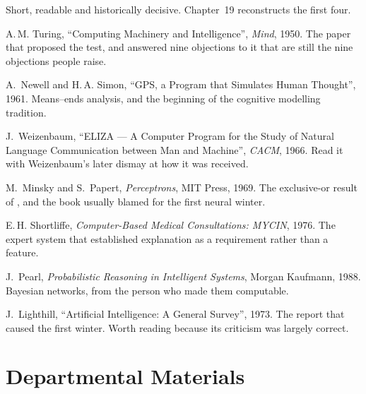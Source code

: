Short, readable and historically decisive. Chapter~19 reconstructs the first four.

\begin{tight}
  \item A.\,M. Turing, ``Computing Machinery and Intelligence'', \emph{Mind},
        1950. The paper that proposed the test, and answered nine objections to it
        that are still the nine objections people raise.
  \item A.\ Newell and H.\,A. Simon, ``GPS, a Program that Simulates Human
        Thought'', 1961. Means--ends analysis, and the beginning of the cognitive
        modelling tradition.
  \item J.\ Weizenbaum, ``ELIZA --- A Computer Program for the Study of Natural
        Language Communication between Man and Machine'', \emph{CACM}, 1966. Read
        it with Weizenbaum's later dismay at how it was received.
  \item M.\ Minsky and S.\ Papert, \emph{Perceptrons}, MIT Press, 1969. The
        exclusive-or result of , and the book usually blamed for
        the first neural winter.
  \item E.\,H. Shortliffe, \emph{Computer-Based Medical Consultations: MYCIN},
        1976. The expert system that established explanation as a requirement
        rather than a feature.
  \item J.\ Pearl, \emph{Probabilistic Reasoning in Intelligent Systems},
        Morgan Kaufmann, 1988. Bayesian networks, from the person who made them
        computable.
  \item J.\ Lighthill, ``Artificial Intelligence: A General Survey'', 1973. The
        report that caused the first winter. Worth reading because its criticism
        was largely correct.
\end{tight}

\section{Departmental Materials}


